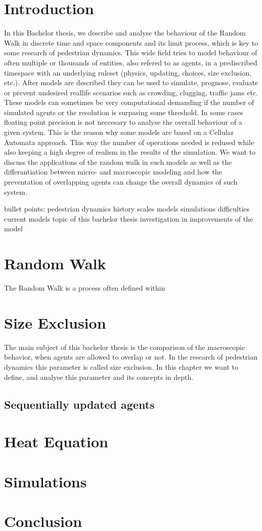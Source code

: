 

\section{Introduction}
In this Bachelor thesis, we describe and analyse the behaviour of the Random Walk in discrete time and space components
and its limit process, which is key to some research of pedestrian dynamics.
This wide field tries to model behaviour of often multiple or thousands of entities, also refered to as agents, in a prediscribed timespace with an underlying 
ruleset (physics, updating, choices, size exclusion, etc.). After models are described they can be used to simulate, prognose, evaluate or prevent undesired reallife scenarios such as crowding, clugging, traffic jams etc. 
These models can sometimes be very computational demanding if the number of simulated agents or the resolution is surpasing some threshold. In some cases floating point precision is not neccesary to analyse the overall behaviour of a given system.
This is the reason why some models are based on a Cellular Automata approach.
This way the number of operations needed is redused while also keeping a high degree of realism in the results of the simulation. 
We want to discuss the applications of the random walk in such models as well as the differantiation between micro- and macroscopic modeling and how the preventation of overlapping agents can change the overall dynamics of such system. 

bullet points: 
pedestrian dynamics history
scales
models 
simulations
difficulties
current models  
topic of this bachelor thesis investigation in improvements of the model 

\section{Random Walk}
The Random Walk is a process often defined within 

\section{Size Exclusion}
The main subject of this bachelor thesis is the comparison of the macroscopic behavior, when agents are allowed to overlap or not.
In the research of pedestrian dynamics this parameter is called size exclusion. In this chapter we want to define, and analyse this parameter and its concepts in depth. 
\subsection*{Sequentially updated agents}
\cite[]{kafka2015prozess}



\section{Heat Equation}


\section{Simulations}


\section{Conclusion}





